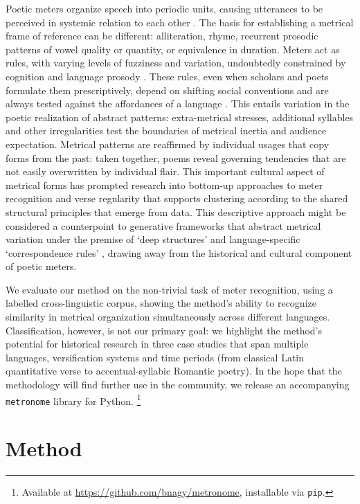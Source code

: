 \documentclass[
    hf
]{ceurart}
\begin{document}
Poetic meters organize speech into periodic units, causing utterances to be perceived in systemic relation to each other \cite{frog_metrical_2021}. The basis for establishing a metrical frame of reference can be different: alliteration, rhyme, recurrent prosodic patterns of vowel quality or quantity, or equivalence in duration. Meters act as rules, with varying levels of fuzziness and variation, undoubtedly constrained by cognition and language prosody \cite{rubin_memory_1995,decastro-arrazola_testing_2018,decastro-arrazola_typological_2018}. These rules, even when scholars and poets formulate them prescriptively, depend on shifting social conventions and are always tested against the affordances of a language \cite{shapir_metrum_2000}. This entails variation in the poetic realization of abstract patterns: extra-metrical stresses, additional syllables and other irregularities test the boundaries of metrical inertia and audience expectation. Metrical patterns are reaffirmed by individual usages that copy forms from the past: taken together, poems reveal governing tendencies that are not easily overwritten by individual flair. This important cultural aspect of metrical forms has prompted research into bottom-up approaches to meter recognition and verse regularity \cite{porter_space_2018, sela_measuring_2022,plechac_rhythm-based_2023} that supports clustering according to the shared structural principles that emerge from data. This descriptive approach might be considered a counterpoint to generative frameworks that abstract metrical variation under the premise of `deep structures' and language-specific `correspondence rules' \cite{fabb_meter_2008}, drawing away from the historical and cultural component of poetic meters.

We evaluate our method on the non-trivial task of meter recognition, using a labelled cross-linguistic corpus, showing the method's ability to recognize similarity in metrical organization simultaneously across different languages. Classification, however, is not our primary goal: we highlight the method's potential for historical research in three case studies that span multiple languages, versification systems and time periods (from classical Latin quantitative verse to accentual-syllabic Romantic poetry). In the hope that the methodology will find further use in the community, we release an accompanying \texttt{metronome} library for Python.%
%
\footnote{Available at \url{https://github.com/bnagy/metronome}, installable via \texttt{pip}.}

\section{Method}
\end{document}
